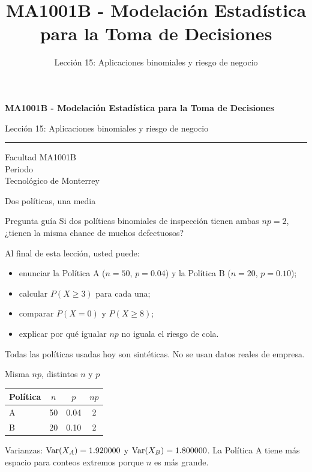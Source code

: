 \documentclass[aspectratio=169,10pt,spanish]{beamer}
\title{MA1001B - Modelación Estadística para la Toma de Decisiones}
\subtitle{Lección 15: Aplicaciones binomiales y riesgo de negocio}
\author{}
\institute{Tecnol\'ogico de Monterrey}
\date{}
\begin{document}
\begin{frame}[plain]
  \vspace{1.2cm}
  {\Large\bfseries MA1001B - Modelación Estadística para la Toma de Decisiones\par}
  \vspace{0.7cm}
  {\large Lección 15: Aplicaciones binomiales y riesgo de negocio\par}
  \vspace{0.7cm}
  {\color{TecRojo}\rule{\textwidth}{1.2pt}}
  \vspace{0.8cm}

  Facultad MA1001B\\[0.3cm]
  Periodo\\[0.3cm]
  Tecnol\'ogico de Monterrey
\end{frame}

\begin{frame}{Dos políticas, una media}
  \begin{alertblock}{Pregunta guía}
    Si dos políticas binomiales de inspección tienen ambas $np=2$, ¿tienen
    la misma chance de muchos defectuosos?
  \end{alertblock}

  \vspace{0.6em}
  Al final de esta lección, usted puede:
  \begin{itemize}
    \item enunciar la Política A ($n=50$, $p=0.04$) y la Política B ($n=20$, $p=0.10$);
    \item calcular $P(X\ge 3)$ para cada una;
    \item comparar $P(X=0)$ y $P(X\ge 8)$;
    \item explicar por qué igualar $np$ no iguala el riesgo de cola.
  \end{itemize}

  \vfill
  \scriptsize Todas las políticas usadas hoy son sintéticas. No se usan datos reales de empresa.
\end{frame}

\begin{frame}{Misma $np$, distintos $n$ y $p$}
  \small
  \begin{center}
    \begin{tabular}{lccc}
      \toprule
      \textbf{Política} & $n$ & $p$ & $np$ \\
      \midrule
      A & 50 & 0.04 & 2 \\
      B & 20 & 0.10 & 2 \\
      \bottomrule
    \end{tabular}
  \end{center}

  \vspace{0.5em}
  Varianzas: $\operatorname{Var}(X_A)=1.920000$ y $\operatorname{Var}(X_B)=1.800000$. La Política A tiene
  más espacio para conteos extremos porque $n$ es más grande.
\end{frame}
\end{document}
